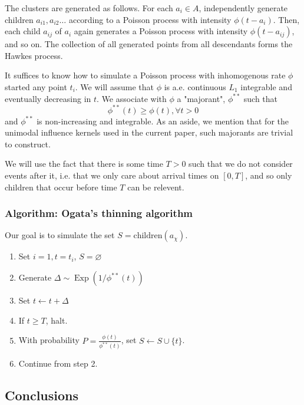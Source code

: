 \documentclass[11pt]{article}
\providecommand{\tightlist}{%
      \setlength{\itemsep}{0pt}\setlength{\parskip}{0pt}}
\begin{document}
The clusters are generated as follows. For each \(a_i \in A\),
independently generate children \(a_{i1},a_{i2}\dots\) according to a
Poisson process with intensity \(\phi(t-a_i)\). Then, each child
\(a_{ij}\) of \(a_i\) again generates a Poisson process with intensity
\(\phi(t − a_{ij})\), and so on. The collection of all generated points
from all descendants forms the Hawkes process.

It suffices to know how to simulate a Poisson process with inhomogenous
rate \(\phi\) started any point \(t_i\). We will assume that \(\phi\) is
a.e. continuous \(L_1\) integrable and eventually decreasing in \(t\).
We associate with \(\phi\) a "majorant", \(\phi^{**}\) such that
\[\phi^{**}(t)\geq\phi(t), \forall t>0\] and \(\phi^{**}\) is
non-increasing and integrable. As an aside, we mention that for the
unimodal influence kernels used in the current paper, such majorants are
trivial to construct.

We will use the fact that there is some time \(T>0\) such that we do not
consider events after it, i.e. that we only care about arrival times on
\([0,T]\), and so only children that occur before time \(T\) can be
relevent.

\subsubsection{Algorithm: Ogata's thinning
algorithm}\label{algorithm-ogatas-thinning-algorithm}

Our goal is to simulate the set \(S=\mathrm{children}(a_\chi)\).

\begin{enumerate}
\def\labelenumi{\arabic{enumi}.}
\tightlist
\item
  Set \(i=1, t=t_i\), \(S=\varnothing\)
\item
  Generate \(\Delta\sim \operatorname{Exp}(1/\phi^{**}(t))\)
\item
  Set \(t\leftarrow t+\Delta\)
\item
  If \(t\geq T\), halt.
\item
  With probability \(P=\frac{\phi(t)}{\phi^{**}(t)}\), set
  \(S\leftarrow S\cup \{t\}\).
\item
  Continue from step 2.
\end{enumerate}

    \subsection{Conclusions}\label{conclusions}
\end{document}
